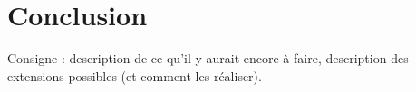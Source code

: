 \section{Conclusion}

Consigne : description de ce qu’il y aurait encore à faire, description des extensions possibles (et comment les réaliser).